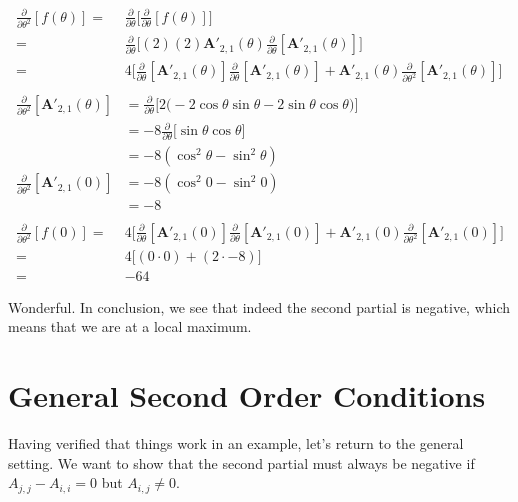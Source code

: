 \documentclass[11pt, oneside]{amsart}
\newcommand{\fpartial}[2]{\frac{\partial #1}{\partial #2}}
\newcommand{\mtx}[1]{\bm{#1}}
\newcommand{\fptheta}{\fpartial{}{\theta}}
\newcommand{\fpthetax}{\fpartial{}{\theta^2}}
\newcommand{\mtxA}{\mtx{A}}
\begin{document}
\begin{equation*}
  \begin{split}
      \fpthetax \left[f(\theta)\right]
    ={}&
      \fptheta \Big[ \fptheta \left[f(\theta)\right] \Big] \\
    ={}&
      \fptheta \Big[
        (2)(2)
        \mtxA'_{2, 1}(\theta)
        \fptheta \left[ \mtxA'_{2, 1}(\theta) \right]
      \Big] \\
    ={}&
      4 \Big[
        \fptheta \left[ \mtxA'_{2, 1}(\theta) \right]
        \fptheta \left[ \mtxA'_{2, 1}(\theta) \right]
        +
        \mtxA'_{2, 1}(\theta)
        \fpthetax \left[ \mtxA'_{2, 1}(\theta) \right]
      \Big] \\
    \\
      \fpthetax \left[ \mtxA'_{2, 1}(\theta) \right]
    &=
      \fptheta \Big[
        2 \big( -2\cos\theta \sin\theta - 2\sin\theta\cos\theta \big)
      \Big] \\
    &=
      -8 \fptheta \Big[ \sin\theta\cos\theta \Big] \\
    &= -8 \left( \cos^2\theta - \sin^2\theta \right) \\
      \fpthetax \left[ \mtxA'_{2, 1}(0) \right]
    &= -8 \left( \cos^2 0 - \sin^2 0 \right) \\
    &= -8 \\
    \\
      \fpthetax \left[f(0)\right]
    ={}&
      4 \Big[
        \fptheta \left[ \mtxA'_{2, 1}(0) \right]
        \fptheta \left[ \mtxA'_{2, 1}(0) \right]
        +
        \mtxA'_{2, 1}(0)
        \fpthetax \left[ \mtxA'_{2, 1}(0) \right]
      \Big] \\
    ={}&
      4 \Big[
        \left(0 \cdot 0\right)
        +
        \left(2 \cdot -8\right)
      \Big] \\
    ={}& -64
  \end{split}
\end{equation*}

Wonderful. In conclusion, we see that indeed the second partial is
negative, which means that we are at a local maximum.

\section{General Second Order Conditions}

Having verified that things work in an example, let's return to the
general setting. We want to show that the second partial must always be
negative if $A_{j, j} - A_{i, i} = 0$ but $A_{i, j} \ne 0$.
\end{document}
